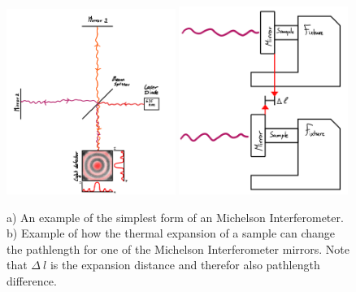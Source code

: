 \documentclass[a4paper,10pt]{article}
\begin{document}
\begin{figure}[h]
    \includegraphics[width=0.49\textwidth]{M_Interferometer2.PNG}
    \includegraphics[width=0.49\textwidth]{Sample_Mirror.PNG}
    \caption{a) An example of the simplest form of an Michelson Interferometer. b) Example of how the thermal expansion of a sample can change the pathlength for one of the Michelson Interferometer mirrors. Note that $\Delta\:l$ is the expansion distance and therefor also pathlength difference.}
    \label{fig:1}
\end{figure}
\end{document}
